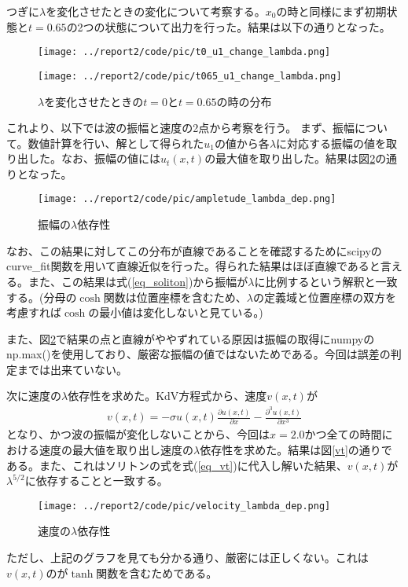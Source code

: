 \documentclass[a4j, dvipdfmx]{jarticle}
\begin{document}
\begin{enumerate}[(1)]
        つぎに$\lambda$を変化させたときの変化について考察する。$x_0$の時と同様にまず初期状態と$t=0.65$の2つの状態について出力を行った。結果は以下の通りとなった。
        \begin{figure}[H]
          \begin{minipage}[b]{0.5\hsize}
            \centering
            \texttt{[image: ../report2/code/pic/t0\_u1\_change\_lambda.png]}
            \label{}
          \end{minipage}
          \begin{minipage}[b]{0.5\hsize}
            \centering
            \texttt{[image: ../report2/code/pic/t065\_u1\_change\_lambda.png]}
            \subcaption{}
            \label{}
          \end{minipage}
          \caption{$\lambda$を変化させたときの$t=0$と$t=0.65$の時の分布}
        \end{figure}
        これより、以下では波の振幅と速度の2点から考察を行う。
        まず、振幅について。数値計算を行い、解として得られた$u_1$の値から各$\lambda$に対応する振幅の値を取り出した。なお、振幅の値には$u_t(x, t)$の最大値を取り出した。結果は図\ref{amp}の通りとなった。
        \begin{figure}[H]
          \centering
          \texttt{[image: ../report2/code/pic/ampletude\_lambda\_dep.png]}
          \caption{振幅の$\lambda$依存性}
          \label{amp}
        \end{figure}

        なお、この結果に対してこの分布が直線であることを確認するためにscipyのcurve\_fit関数を用いて直線近似を行った。得られた結果はほぼ直線であると言える。また、この結果は式(\ref{eq_soliton})から振幅が$\lambda$に比例するという解釈と一致する。(分母の$\cosh$関数は位置座標を含むため、$\lambda$の定義域と位置座標の双方を考慮すれば$\cosh$の最小値は変化しないと見ている。)

        また、図\ref{amp}で結果の点と直線がややずれている原因は振幅の取得にnumpyのnp.max()を使用しており、厳密な振幅の値ではないためである。今回は誤差の判定までは出来ていない。

        次に速度の$\lambda$依存性を求めた。KdV方程式から、速度$v(x, t)$が
        \begin{align}
          v(x, t) = -\sigma u(x, t)\frac{\partial u(x, t)}{\partial x} - \frac{\partial^3 u(x, t)}{\partial x^3} \label{eq_vt}
        \end{align}
        となり、かつ波の振幅が変化しないことから、今回は$x=2.0$かつ全ての時間における速度の最大値を取り出し速度の$\lambda$依存性を求めた。結果は図\ref{vt}の通りである。また、これはソリトンの式を式(\ref{eq_vt})に代入し解いた結果、$v(x, t)$が$\lambda^{5/2}$に依存することと一致する。
        \begin{figure}[H]
          \centering
          \texttt{[image: ../report2/code/pic/velocity\_lambda\_dep.png]}
          \caption{速度の$\lambda$依存性}
          \label{}
        \end{figure}
        ただし、上記のグラフを見ても分かる通り、厳密には正しくない。これは$v(x, t)$のが$\tanh$関数を含むためである。


\end{enumerate}
\end{document}
